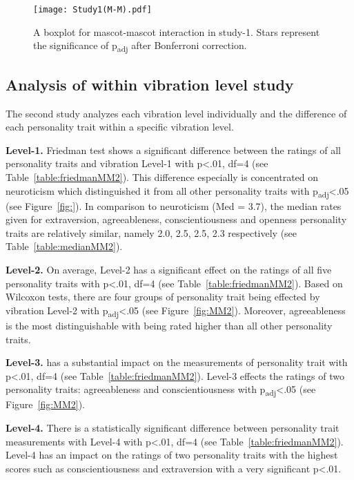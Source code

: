 \begin{figure}[!htb]
    \centering
    \texttt{[image: Study1(M-M).pdf]}
    \caption[]{A boxplot for mascot-mascot interaction in study-1.
    Stars represent the significance of p\textsubscript{adj} after Bonferroni correction.\footnotemark}
    \label{fig:MM1}
\end{figure}
\subsection{Analysis of within vibration level study}
\label{subsec:MMstudy2}
The second study analyzes each vibration level individually and the difference
of each personality trait within a specific vibration level.

\par\textbf{Level-1.}
Friedman test shows a significant difference between the ratings of all personality traits
and vibration Level-1 with p<.01, df=4 (see Table~\ref{table:friedmanMM2}).
This difference especially is concentrated on neuroticism which distinguished it from all
other personality traits with p\textsubscript{adj}<.05 (see Figure~\ref{fig:}).
In comparison to neuroticism (Med = 3.7), the median rates given for extraversion,
agreeableness, conscientiousness and openness personality traits are relatively similar,
namely 2.0, 2.5, 2.5, 2.3 respectively (see Table~\ref{table:medianMM2}).

\par\textbf{Level-2.}
On average, Level-2 has a significant effect on the ratings of all five personality
traits with p<.01, df=4 (see Table~\ref{table:friedmanMM2}).
Based on Wilcoxon tests, there are four groups of personality trait being effected by
vibration Level-2 with p\textsubscript{adj}<.05 (see Figure~\ref{fig:MM2}).
Moreover, agreeableness is the most distinguishable with being rated higher
than all other personality traits.

\par\textbf{Level-3.}
has a substantial impact on the measurements of personality trait
with p<.01, df=4 (see Table~\ref{table:friedmanMM2}).
Level-3 effects the ratings of two personality traits: agreeableness and
conscientiousness with p\textsubscript{adj}<.05 (see Figure~\ref{fig:MM2}).

\par\textbf{Level-4.}
There is a statistically significant difference between personality trait measurements
with Level-4 with p<.01, df=4 (see Table~\ref{table:friedmanMM2}).
Level-4 has an impact on the ratings of two personality traits with the highest scores
such as conscientiousness and extraversion
with a very significant p<.01.

